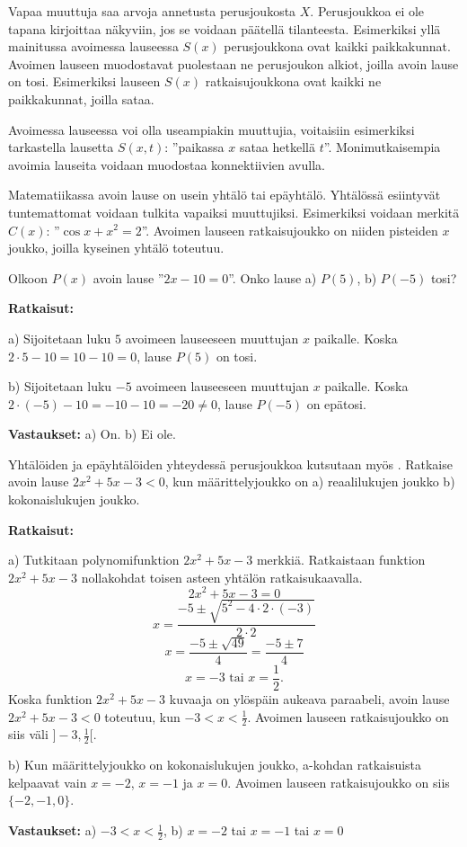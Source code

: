 Vapaa muuttuja saa arvoja annetusta perusjoukosta $X$. Perusjoukkoa ei ole tapana kirjoittaa näkyviin, jos se voidaan päätellä tilanteesta. Esimerkiksi yllä mainitussa avoimessa lauseessa $S(x)$ perusjoukkona ovat kaikki paikkakunnat. Avoimen lauseen  muodostavat puolestaan ne perusjoukon alkiot, joilla avoin lause on tosi. Esimerkiksi lauseen $S(x)$ ratkaisujoukkona ovat kaikki ne paikkakunnat, joilla sataa.

Avoimessa lauseessa voi olla useampiakin muuttujia, voitaisiin esimerkiksi tarkastella lausetta $S(x,t)$: ''paikassa $x$ sataa hetkellä $t$''. Monimutkaisempia avoimia lauseita voidaan muodostaa konnektiivien
avulla.

Matematiikassa avoin lause on usein yhtälö tai epäyhtälö. Yhtälössä esiintyvät tuntemattomat voidaan tulkita vapaiksi muuttujiksi. Esimerkiksi voidaan merkitä $C(x)$: ''$\cos x + x^2= 2$''. Avoimen lauseen ratkaisujoukko on niiden pisteiden $x$ joukko, joilla kyseinen yhtälö toteutuu.

\begin{esimerkki}
Olkoon $P(x)$ avoin lause ''$2x - 10 = 0$''. Onko lause a) $P(5)$, b) $P(-5)$ tosi?

{\bf Ratkaisut:}

a) Sijoitetaan luku $5$ avoimeen lauseeseen muuttujan $x$ paikalle. Koska $2\cdot 5 - 10 = 10 - 10 = 0$, lause $P(5)$ on tosi.

b) Sijoitetaan luku $-5$ avoimeen lauseeseen muuttujan $x$ paikalle. Koska $2\cdot(-5) - 10 = -10 - 10 = -20 \neq 0$, lause $P(-5)$ on epätosi.

{\bf Vastaukset:} a) On. b) Ei ole.
\end{esimerkki}

\begin{esimerkki}
Yhtälöiden ja epäyhtälöiden yhteydessä perusjoukkoa kutsutaan myös . Ratkaise avoin lause $2x^2 + 5x - 3 < 0$, kun määrittelyjoukko on a) reaalilukujen joukko b) kokonaislukujen joukko.

{\bf Ratkaisut:}

a) Tutkitaan polynomifunktion $2x^2 + 5x - 3$ merkkiä. Ratkaistaan funktion $2x^2 + 5x - 3$ nollakohdat toisen asteen yhtälön ratkaisukaavalla.
\[
2x^2 + 5x - 3 = 0
\]
\[
x =\frac{-5\pm\sqrt{5^2-4\cdot 2\cdot(-3)}}{2\cdot 2}
\] 
\[
x = \frac{-5\pm\sqrt{49}}{4} =\frac{-5\pm 7}{4}
\]
\[
x = -3\textrm{  tai  }x =\frac{1}{2}.
\]
Koska funktion $2x^2 + 5x - 3$ kuvaaja on ylöspäin aukeava paraabeli, avoin lause $2x^2 + 5x - 3 < 0$ toteutuu, kun $-3 < x < \frac{1}{2}$. Avoimen lauseen ratkaisujoukko on siis väli $]-3, \frac{1}{2}[$.

b) Kun määrittelyjoukko on kokonaislukujen joukko, a-kohdan ratkaisuista kelpaavat vain $x = -2$, $x = -1$ ja $x = 0$. Avoimen lauseen ratkaisujoukko on siis $\{-2, -1, 0\}$.

{\bf Vastaukset:} a) $-3 < x < \frac{1}{2}$, b) $x = -2$ tai $x = -1$ tai $x = 0$
\end{esimerkki}

